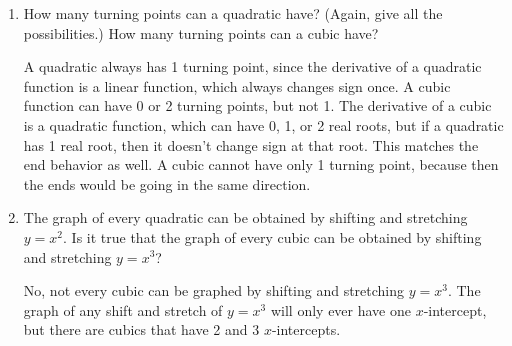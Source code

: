 \documentclass{article}
\begin{document}
\begin{enumerate}[resume, topsep=0pt]
\begin{enumerate}
  \item


    \begin{problem}[\vfill]
      How many turning points can a quadratic have? (Again, give all the possibilities.) How many turning points can a cubic have? 
    \end{problem}

    \begin{solution}
      A quadratic always has 1 turning point, since the derivative
      of a quadratic function is a linear function, which always
      changes sign once. A cubic function can have 0 or 2 turning points,
      but not 1. The derivative of a cubic is a quadratic function,
      which can have 0, 1, or 2 real roots, but if a quadratic has 1 real
      root, then it doesn't change sign at that root. This matches
      the end behavior as well. A cubic cannot have only 1 turning point,
      because then the ends would be going in the same direction.
    \end{solution}

  \item


    \begin{problem}[\nstretch{0.25}]
      The graph of every quadratic can be obtained by shifting and stretching $y = x^2$. Is it true that the graph of every cubic can be obtained by shifting and stretching $y = x^3$? 
    \end{problem}

    \begin{solution}
      No, not every cubic can be graphed by shifting and stretching
      $y=x^3$. The graph of any shift and stretch of $y=x^3$ will
      only ever have one $x$-intercept, but there are cubics
      that have 2 and 3 $x$-intercepts.
    \end{solution}


\end{enumerate}
\end{enumerate}
\end{document}
